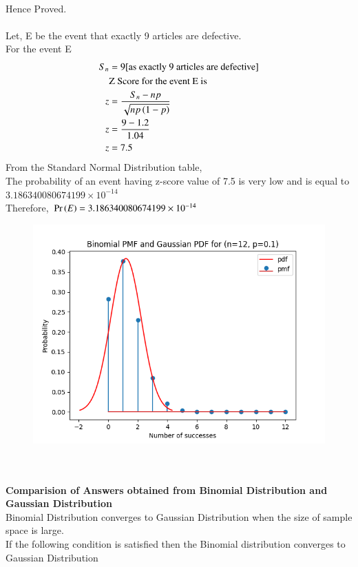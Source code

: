 \documentclass[journal,12pt,twocolumn]{IEEEtran}
\begin{document}
\\Hence Proved.
\\
 \\Let, E be the event that exactly 9 articles are defective.
 \\For the event E
 \begin{align}
    S_n &= 9 \text{[as exactly 9 articles are defective]}\nonumber\\
    &\text{Z Score for the event E is} \nonumber\\
    z &= \frac{S_n-np}{\sqrt{np\left(1-p\right)}}\\
    z &= \frac{9-1.2}{1.04}\nonumber\\
    z &= 7.5
    \end{align}
From the Standard Normal Distribution table,
\\The probability of an event having z-score value of 7.5 is very low and is equal to $3.186340080674199 \times 10^{-14}$
\\Therefore, $\Pr\left(E\right) = 3.186340080674199 \times 10^{-14}$
\begin{figure}[h]
\centering
\includegraphics[width=\columnwidth]{./figs/graph.png}
\end{figure}
\\
\\\textbf{Comparision of Answers obtained from Binomial Distribution and Gaussian Distribution}
\\Binomial Distribution converges to Gaussian Distribution when the size of sample space is large.
\\If the following condition is satisfied then the Binomial distribution converges to Gaussian Distribution
\end{document}

